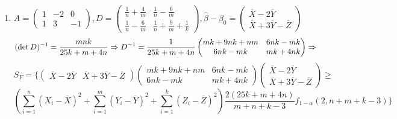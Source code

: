 {{\begin{enumerate}[label=\alph*]
\[\begin{pmatrix}
    \end{pmatrix}
    \ge
    \] \[
    \left(\sum_{i = 1}^n (X_i - \overline{X})^2 + \sum_{i = 1}^m (Y_i - \overline{Y})^2 + \sum_{i = 1}^k (Z_i - \overline{Z})^2\right)\frac{2(3k + n + m)}{m + n + k - 3}f_{1 - \alpha}(2, n + m + k - 3)
    \}
    \]
    \item $A = 
    \begin{pmatrix}
    1 & -2 & 0 \\
    1 & 3 & -1
    \end{pmatrix}, 
    D = 
    \begin{pmatrix}
    \frac{1}{n} + \frac{4}{m} & \frac{1}{n} - \frac{6}{m} \\
    \frac{1}{n} - \frac{6}{m} & \frac{1}{n} + \frac{9}{m} + \frac{1}{k}
    \end{pmatrix},
    \hat{\beta} - \beta_0 = 
    \begin{pmatrix}
    \overline{X} - 2\overline{Y} \\
    \overline{X} + 3\overline{Y} - \overline{Z}
    \end{pmatrix}
    $
    \[
    (\det D)^{-1} = \frac{mnk}{25k + m + 4n} \Rightarrow D^{-1} = \frac{1}{25k + m + 4n}
    \begin{pmatrix}
    mk + 9nk + nm & 6nk - mk \\
    6nk - mk & mk + 4nk 
    \end{pmatrix} \Rightarrow 
    \]
    \[S_{F} = 
    \{
    \begin{pmatrix}
    \overline{X} - 2\overline{Y} &
    \overline{X} + 3\overline{Y} - \overline{Z}
    \end{pmatrix}
    \begin{pmatrix}
    mk + 9nk + nm & 6nk - mk \\
    6nk - mk & mk + 4nk 
    \end{pmatrix}
    \begin{pmatrix}
    \overline{X} - 2\overline{Y} \\
    \overline{X} + 3\overline{Y} - \overline{Z}
    \end{pmatrix}
    \ge
    \] \[
    \left(\sum_{i = 1}^n (X_i - \overline{X})^2 + \sum_{i = 1}^m (Y_i - \overline{Y})^2 + \sum_{i = 1}^k (Z_i - \overline{Z})^2\right)\frac{2(25k + m + 4n)}{m + n + k - 3}f_{1 - \alpha}(2, n + m + k - 3)
    \}
    \]
  \end{enumerate}
  }
  }
